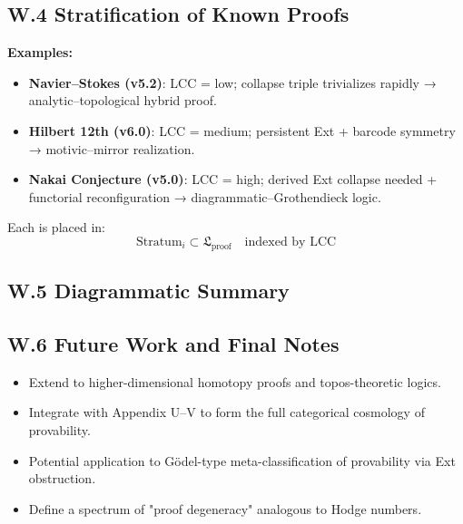 \documentclass[11pt]{article}
\begin{document}
\subsection*{W.4 Stratification of Known Proofs}

\textbf{Examples:}

\begin{itemize}
  \item \textbf{Navier–Stokes (v5.2)}: LCC = low; collapse triple trivializes rapidly → analytic–topological hybrid proof.
  \item \textbf{Hilbert 12th (v6.0)}: LCC = medium; persistent Ext + barcode symmetry → motivic–mirror realization.
  \item \textbf{Nakai Conjecture (v5.0)}: LCC = high; derived Ext collapse needed + functorial reconfiguration → diagrammatic–Grothendieck logic.
\end{itemize}

Each is placed in:
\[
\mathrm{Stratum}_i \subset \mathfrak{L}_{\mathrm{proof}} \quad \text{indexed by } \mathrm{LCC}
\]

\subsection*{W.5 Diagrammatic Summary}

\vspace{1em}
\begin{center}
\end{center}
\vspace{1em}

\subsection*{W.6 Future Work and Final Notes}

\begin{itemize}
  \item Extend to higher-dimensional homotopy proofs and topos-theoretic logics.
  \item Integrate with Appendix U–V to form the full categorical cosmology of provability.
  \item Potential application to Gödel-type meta-classification of provability via Ext obstruction.
  \item Define a spectrum of "proof degeneracy" analogous to Hodge numbers.
\end{itemize}
\end{document}
